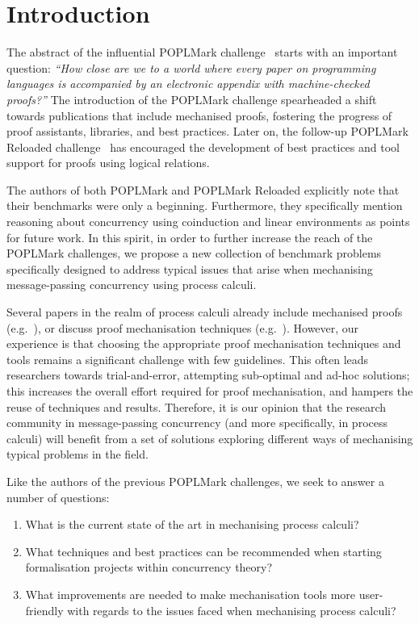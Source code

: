 \documentclass[runningheads]{llncs}
\begin{document}
\section{Introduction}


The abstract of the influential POPLMark challenge~\cite{POPLMark} starts with
an important question: \emph{``How close are we to a world where every paper on
programming languages is accompanied by an electronic appendix with
machine-checked proofs?''} The introduction of the POPLMark
challenge spearheaded a shift towards publications that include
mechanised proofs, fostering the progress of proof assistants,
libraries, and best practices.  Later on, the follow-up POPLMark
Reloaded challenge~\cite{POPLMarkReloaded} has encouraged the development of
best practices and tool support for proofs using logical relations.

The authors of both POPLMark and POPLMark Reloaded explicitly
note that their benchmarks were only a beginning.  Furthermore, they
specifically mention reasoning about concurrency using coinduction and
linear environments as points for future work.  In this spirit, in order to
further increase the reach of the POPLMark challenges, we propose a new
collection of benchmark problems specifically designed to address typical issues
that arise when mechanising message-passing concurrency using process calculi.

Several papers in the realm of process calculi already include mechanised proofs
(e.g.~\cite{DBLP:conf/pldi/Castro-Perez0GY21,DBLP:conf/tacas/CastroFY20,lmcs:9985,
  DBLP:journals/jar/CruzFilipeMP23, Tirore:2023}), or
discuss proof mechanisation techniques
(e.g.~\cite{DBLP:journals/jar/BengtsonPW16, DBLP:conf/tphol/Gay01,
  DBLP:conf/ppdp/Thiemann19, DBLP:conf/forte/ZalakainD21}).  However, our
experience is that choosing the appropriate proof mechanisation techniques and
tools remains a significant challenge with few guidelines.  This often leads
researchers towards trial-and-error, attempting sub-optimal and ad-hoc
solutions; this increases the overall effort required for proof mechanisation,
and hampers the reuse of techniques and results.
%
Therefore, it is our opinion that the research community in message-passing
concurrency (and more specifically, in process calculi) will benefit from a set
of solutions exploring different ways of mechanising typical problems in the
field.

Like the authors of the previous POPLMark challenges, we seek to
answer a number of questions:
\begin{enumerate}[label=\textbf{(Q\arabic*)},leftmargin=10mm]
\item What is the current state of the art in mechanising process calculi?
\item What techniques and best practices can be recommended when starting formalisation projects within concurrency theory?
\item What improvements are needed to make mechanisation tools more user-friendly with regards to the issues faced when mechanising process calculi?
\end{enumerate}
\end{document}
